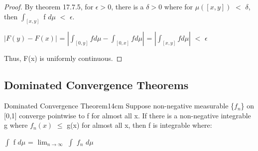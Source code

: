     \begin{proof}
        By {\color{red} theorem 17.7.5}, for $\epsilon > 0$,
        there is a $\delta > 0$ where for $\mu([x,y])$ $<$ $\delta$, then
        $\int_{[x,y]}$ f $d\mu$ $<$ $\epsilon$.

        \hspace{0.5cm}
        $|F(y) - F(x)|$
        = $|\int_{[0,y]} f d\mu - \int_{[0,x]} f d\mu|$
        = $|\int_{[x,y]} f d\mu|$
        $<$ $\epsilon$

        Thus, F(x) is uniformly continuous.
    \end{proof}

    \vspace{0.5cm}





\subsection{ Dominated Convergence Theorems }

    \begin{wtheorem}{Dominated Convergence Theorem}{14cm}
        Suppose non-negative measurable \{$f_n$\} on [0,1]
        converge pointwise to f for almost all x.
        If there is a non-negative integrable g where
        $f_n(x)$ $\leq$ g(x) for almost all x, then f is integrable where:

        \hspace{0.5cm}
        $\int$ f $d\mu$ = $\lim_{n \rightarrow \infty}$ $\int$ $f_n$ $d\mu$
    \end{wtheorem}


